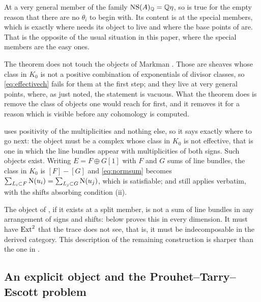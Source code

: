 \begin{remark}\label{rem:markmanpositivity}
At a very general member of the family $\mathrm{NS}(A)_{\mathbb{Q}}=\mathbb{Q}\eta$, so
 is true for the empty reason that there are no
$\theta_{i}$ to begin with. Its content is at the special members, which is
exactly where  needs its object to live and where the
base points of  are. That is the opposite of the usual
situation in this paper, where the special members are the easy ones.

The theorem does not touch the objects of Markman \cite{Mar25a,Mar25b}.
Those are sheaves whose class in $K_{0}$ is not a positive combination of
exponentials of divisor classes, so \eqref{eq:effectivech} fails for them at
the first step; and they live at very general points, where, as just noted,
the statement is vacuous. What the theorem does is remove the class of
objects one would reach for first, and it removes it for a reason which is
visible before any cohomology is computed.
\end{remark}

\begin{remark}
\label{rem:whatitmustbe}
 uses positivity of the multiplicities and nothing else,
so it says exactly where to go next: the object must be a complex whose
class in $K_{0}$ is not effective, that is one in which the line bundles
appear with multiplicities of both signs. Such objects exist. Writing
$E=F\oplus G[1]$ with $F$ and $G$ sums of line bundles, the class in $K_{0}$
is $[F]-[G]$ and \eqref{eq:normsum} becomes
$\sum_{L_{i}\subset F}\mathrm{N}(u_{i})=\sum_{L_{j}\subset G}\mathrm{N}(u_{j})$, which is
satisfiable; and  still applies verbatim, with the
shifts absorbing condition (ii).

The object of , if it exists at a split member, is
not a sum of line bundles in any arrangement of signs and shifts:
 below proves this in every dimension. It must have
$\operatorname{Ext}^{2}$ that the trace does not see, that is, it must be indecomposable in
the derived category. This description of the remaining construction is
sharper than the one in .
\end{remark}

\subsection{An explicit object and the Prouhet--Tarry--Escott problem}
\label{ssec:pte}

